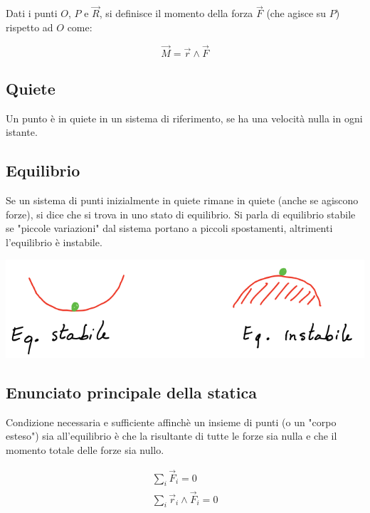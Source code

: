 \documentclass{article}
\begin{document}
\noindent
Dati i punti $O$, $P$ e $\vec{R}$, si definisce il momento della forza $\vec{F}$ (che agisce su $P$) rispetto ad $O$ come:

$$
\vec{M} = \vec{r} \wedge \vec{F}
$$

\subsection{Quiete}

Un punto è in quiete in un sistema di riferimento, se ha una velocità nulla in ogni istante.

\subsection{Equilibrio}

Se un sistema di punti inizialmente in quiete rimane in quiete (anche se agiscono forze), si dice che si trova in uno stato di equilibrio.
Si parla di equilibrio stabile se "piccole variazioni" dal sistema portano a piccoli spostamenti, altrimenti l'equilibrio è instabile.

\includegraphics[width=\columnwidth]{equilibrio-stabile-e-instabile}

\subsection{Enunciato principale della statica}

Condizione necessaria e sufficiente affinchè un insieme di punti (o un "corpo esteso") sia all'equilibrio è che la risultante di tutte le forze sia nulla e che il momento totale delle forze sia nullo.

$$
\begin{matrix}
\sum_i \vec{F}_i = 0 \\
\sum_i \vec{r}_i \wedge \vec{F}_i = 0
\end{matrix}
$$
\end{document}
